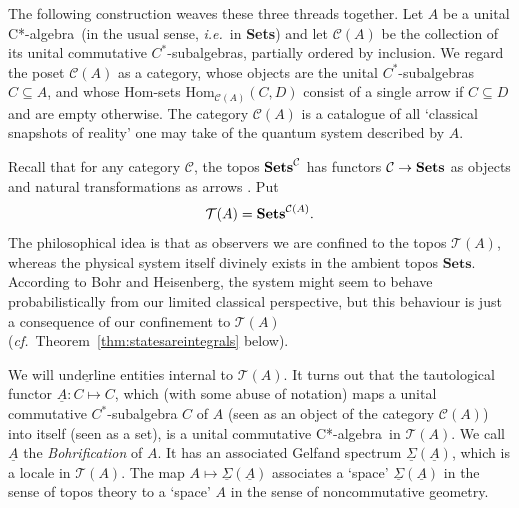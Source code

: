 \documentclass[11pt]{article}
\newcommand{\beq}{\begin{equation}}
\newcommand{\eeq}{\end{equation}}
\newcommand{\Sets}{\mbox{\textbf{Sets}}}
\newcommand{\ca}{C*-algebra} \newcommand{\jba}{JB-algebra}
\newcommand{\raw}{\rightarrow} \newcommand{\rat}{\mapsto}
\newcommand{\CA}{{\mathcal A}} \newcommand{\CB}{{\mathcal B}}
\newcommand{\alg}[1]{\ensuremath{#1}}
\newcommand{\functor}[1]{\ensuremath{\underline{#1}}}
\newcommand{\Cat}[1]{\ensuremath{\mathrm{\textbf{#1}}}}
\newcommand{\Set}{\Cat{Sets}\xspace}
\newcommand{\context}{\ensuremath{\mathcal{C}}}
\newcommand{\asstopos}{\ensuremath{\mathcal{T}}}
\newcommand{\uA}{\underline{A}}
\renewcommand{\CA}{\mathcal{C}(A)}
\newcommand{\TA}{\mathcal{T}(A)}
\newcommand{\ie}{\textit{i.e.}}
\newcommand{\ulS}{\functor{\Sigma}}
\newcommand{\ulA}{\underline{A}}
\renewcommand{\TA}{\asstopos(\alg{A})}
\renewcommand{\CA}{\context(\alg{A})}
\begin{document}
The following construction  weaves these three threads together.
 Let $A$ be a unital \ca\ (in the usual sense, \ie\ in \Sets)
and let $\CA$ be the collection of its unital
commutative $C^*$-subalgebras, partially ordered by inclusion. We
regard the poset $\CA$ as a category, whose objects are
the  unital $C^*$-subalgebras $C\subseteq A$, and whose Hom-sets
$\mathrm{Hom}_{\CA}(C,D)$ consist of a single arrow if
$C\subseteq D$ and are empty otherwise. The category $\CA$ is a catalogue of all
`classical snapshots of reality' one may take of the quantum system described by
$A$.

Recall that for any category $\mathcal{C}$,
the topos $\Sets^{\mathcal{C}}$ has functors
$\mathcal{C}\raw\Sets$ as objects  and natural
transformations as arrows \cite{maclanemoerdijk92}.
 Put
\beq
  \asstopos(\alg{A})=\Sets^{\CA}.\label{defTA}
\eeq
The philosophical idea is that  as
observers we are confined to the topos $\asstopos(\alg{A})$, whereas
the physical system itself divinely  exists in the ambient topos
$\Set$. According to Bohr and Heisenberg, the system
might seem to behave probabilistically from our limited classical
perspective, but this behaviour  is just a consequence of our confinement to
$\asstopos(\alg{A})$ ({\it cf.}\ Theorem~\ref{thm:statesareintegrals} below).

We will $\underline{\mathrm{underline}}$ entities internal to $\TA$.
It turns out that the tautological functor
$\ulA:C\mapsto C$, which (with some abuse of notation) maps a  unital
commutative $C^*$-subalgebra $C$ of $A$ (seen as an object of the
category $\CA$) into itself (seen as a set), is a unital
commutative \ca\ in $\asstopos(\alg{A})$. We call $\ulA$ the {\it Bohrification}
of $A$.
It has an
associated Gelfand spectrum $\ulS(\uA)$, which is a locale in $\TA$. The map
$A\mapsto \ulS(\uA)$
associates a `space' $\ulS(\uA)$ in the sense of topos theory to a `space' $A$
in the sense of noncommutative geometry.
\end{document}
